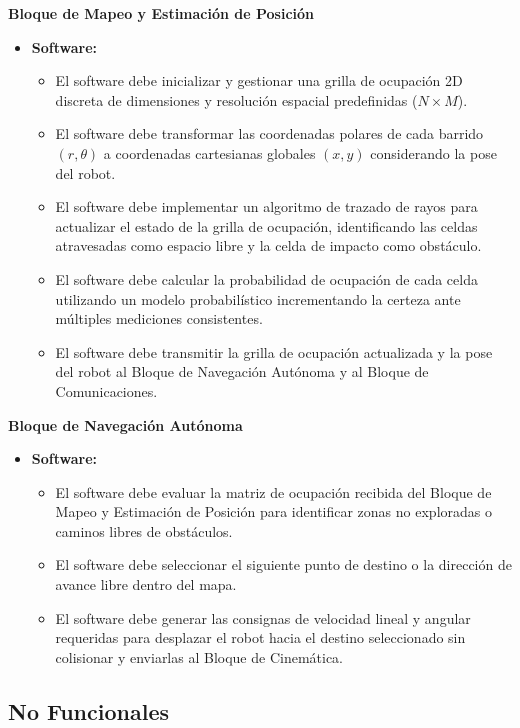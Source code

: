 \documentclass[12pt,a4paper]{article}
\begin{document}
\noindent\textbf{Bloque de Mapeo y Estimación de Posición}
\begin{itemize}
    \item \textbf{Software:}
    \begin{itemize}
        \item El software debe inicializar y gestionar una grilla de ocupación 2D discreta de dimensiones y resolución espacial predefinidas ($N \times M$).
        \item El software debe transformar las coordenadas polares de cada barrido $(r, \theta)$ a coordenadas cartesianas globales $(x, y)$ considerando la pose del robot.
        \item El software debe implementar un algoritmo de trazado de rayos para actualizar el estado de la grilla de ocupación, identificando las celdas atravesadas como espacio libre y la celda de impacto como obstáculo.
        \item El software debe calcular la probabilidad de ocupación de cada celda utilizando un modelo probabilístico incrementando la certeza ante múltiples mediciones consistentes.
        \item El software debe transmitir la grilla de ocupación actualizada y la pose del robot al Bloque de Navegación Autónoma y al Bloque de Comunicaciones.
    \end{itemize}
\end{itemize}

\noindent\textbf{Bloque de Navegación Autónoma}
\begin{itemize}
    \item \textbf{Software:}
    \begin{itemize}
        \item El software debe evaluar la matriz de ocupación recibida del Bloque de Mapeo y Estimación de Posición para identificar zonas no exploradas o caminos libres de obstáculos.
        \item El software debe seleccionar el siguiente punto de destino o la dirección de avance libre dentro del mapa.
        \item El software debe generar las consignas de velocidad lineal y angular requeridas para desplazar el robot hacia el destino seleccionado sin colisionar y enviarlas al Bloque de Cinemática.
    \end{itemize}
\end{itemize}

\subsection{No Funcionales}
\end{document}
